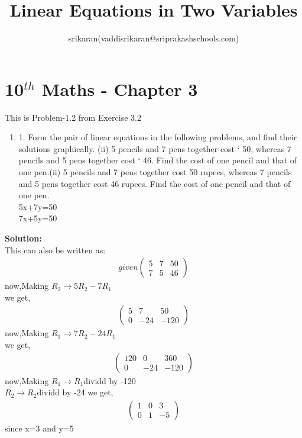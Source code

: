 \documentclass[12pt]{article}
\title{Linear Equations in Two Variables}
\author{srikaran(vaddisrikaran@sriprakashschools.com)}
\newcommand{\myvec}[1]{\ensuremath{\begin{pmatrix}#1\end{pmatrix}}}
\newcommand{\solution}{\noindent \textbf{Solution: }}
\begin{document}
\maketitle
\section*{10$^{th}$ Maths - Chapter 3}
This is Problem-1.2 from Exercise 3.2
\begin{enumerate}
\item 1. Form the pair of linear equations in the following problems, and find their solutions graphically. (ii) 5 pencils and 7 pens together cost ` 50, whereas 7 pencils and 5 pens together
cost ` 46. Find the cost of one pencil and that of one pen.(ii) 5 pencils and 7 pens together cost  50 rupees, whereas 7 pencils and 5 pens together cost 46 rupees. Find the cost of one pencil and that of one pen.\\
5x+7y=50\\
7x+5y=50\\
\end{enumerate}
\solution\\
This can also be written as:
\begin{align}
given
\myvec{5&7&50\\7&5&46}
\end{align}
now,Making $R_2 \xrightarrow\ 5R_2 - 7R_1$\\ 
we get,
\begin{align}
\myvec{5&7&50\\0&-24&-120}
\end{align}
now,Making $R_1 \xrightarrow\ 7R_2 - 24R_1$\\ 
we get,
\begin{align}
\myvec{120&0&360\\0&-24&-120}
\end{align}
now,Making $R_1 \xrightarrow\ R_1 $dividd by -120\\
$R_2 \xrightarrow\ R_2 $dividd by -24
we get,
\begin{align}
\myvec{1&0&3\\0&1&-5}
\end{align}
since x=3 and y=5
\end{document}
